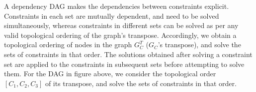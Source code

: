 A dependency DAG makes the dependencies between constraints explicit.
Constraints in each set are mutually dependent, and need to be solved
simultaneously, whereas constraints in different sets can be solved as
per any valid topological ordering of the graph's transpose.
Accordingly, we obtain a topological ordering of nodes in the graph
$G_{{C}}^{T}$ ($G_C$'s transpose), and solve the sets of constraints
in that order. The solutions obtained after solving a constraint set
are applied to the constraints in subsequent sets before attempting to
solve them. For the DAG in figure above, we consider the topological
order $[C_1, C_2, C_3]$ of its transpose, and solve the sets of
constraints in that order.


